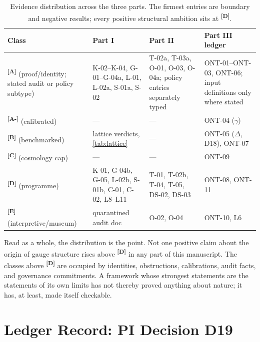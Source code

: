 \documentclass[12pt,a4paper,twoside]{article}
\theoremstyle{plain}
\theoremstyle{definition}
\theoremstyle{remark}
\newcommand{\catmark}[1]{\textsuperscript{\textsf{\textbf{[#1]}}}}
\begin{document}
\begin{table}[htbp]
\centering\small
\renewcommand{\arraystretch}{1.15}
\begin{tabular}{@{}
>{\raggedright\arraybackslash}p{}
>{\raggedright\arraybackslash}p{}
>{\raggedright\arraybackslash}p{}
>{\raggedright\arraybackslash}p{}
@{}}
\toprule
Class & Part I & Part II & Part III ledger \\
\midrule
\catmark{A} (proof/identity; stated audit or policy subtype) & K-02--K-04, G-01--G-04a, L-01, L-02a, S-01a, S-02 & T-02a, T-03a, O-01, O-03, O-04a; policy entries separately typed & ONT-01--ONT-03, ONT-06; input definitions only where stated \\
\catmark{A-} (calibrated) & --- & --- & ONT-04 ($\gamma$) \\
\catmark{B} (benchmarked) & lattice verdicts, \cref{tab:lattice} & --- & ONT-05 ($\Delta$, D18), ONT-07 \\
\catmark{C} (cosmology cap) & --- & --- & ONT-09 \\
\catmark{D} (programme) & K-01, G-04b, G-05, L-02b, S-01b, C-01, C-02, L8--L11 & T-01, T-02b, T-04, T-05, DS-02, DS-03 & ONT-08, ONT-11 \\
\catmark{E} (interpretive/museum) & quarantined audit doc & O-02, O-04 & ONT-10, L6 \\
\bottomrule
\end{tabular}
\caption{Evidence distribution across the three parts. The firmest
entries are boundary and negative results; every positive structural
ambition sits at \catmark{D}.}
\label{tab:consolidated}
\end{table}

\noindent Read as a whole, the distribution is the point. Not one
positive claim about the origin of gauge structure rises above
\catmark{D} in any part of this manuscript. The classes above \catmark{D} are
occupied by identities, obstructions, calibrations, audit facts, and
governance commitments. A framework whose strongest statements are the
statements of its own limits has not thereby proved anything about
nature; it has, at least, made itself checkable.

\newpage
\section{Ledger Record: PI Decision D19}
\label{sec:d19-ledger-record}
\end{document}
